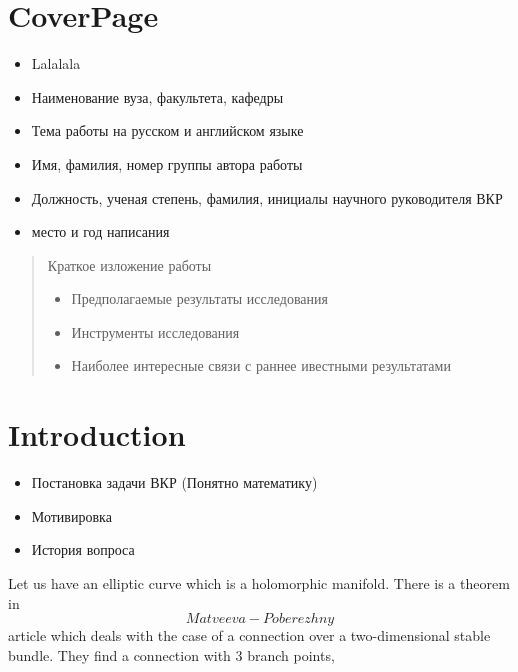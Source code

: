 \documentclass[11pt]{article}
\begin{document}
    \section*{CoverPage}
        \begin{itemize}
            \item Lalalala
            \item Наименование вуза, факультета, кафедры
            \item Тема работы на русском и английском языке
            \item Имя, фамилия, номер группы автора работы
            \item Должность, ученая степень, фамилия,
            инициалы научного руководителя ВКР
            \item место и год написания
        \end{itemize}

    \begin{abstract}
        Краткое изложение работы
        \begin{itemize}
            \item Предполагаемые результаты исследования
            \item Инструменты исследования
            \item Наиболее интересные связи с раннее ивестными результатами
        \end{itemize}


    \end{abstract}


    \section{Introduction}\label{sec:introduction}
        \begin{itemize}
            \item Постановка задачи ВКР (Понятно математику)
            \item Мотивировка
            \item История вопроса
        \end{itemize}

        Let us have an elliptic curve which is a holomorphic manifold.
    There is a theorem in \[Matveeva-Poberezhny\] article which deals
    with the case of a connection over a two-dimensional stable bundle.
    They find a connection with $3$ branch points,
\end{document}
